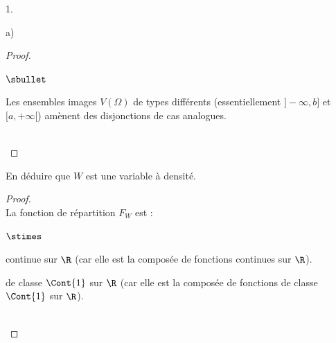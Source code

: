 \begin{noliste}{1.}
\begin{noliste}{a)}
\begin{proof}
\begin{remark}
\begin{noliste}{$\sbullet$}
        \item Les ensembles images $V(\Omega)$ de types différents
          (essentiellement $]-\infty, b]$ et $[a, +\infty[$) amènent
          des disjonctions de cas analogues.
        \end{noliste}
      \end{remark}~\\[-1.2cm]
    \end{proof}
    

    \newpage


  \item En déduire que $W$ est une variable à densité.
  
  \begin{proof}~\\
      La fonction de répartition $F_W$ est :
      \begin{noliste}{$\stimes$}
      \item continue sur $\R$ (car elle est la composée de fonctions
        continues sur $\R$).
      \item de classe $\Cont{1}$ sur $\R$ (car elle est la composée de
        fonctions de classe $\Cont{1}$ sur $\R$).
      \end{noliste}
      ~\\[-1.2cm]
    \end{proof}
  \end{noliste}
\end{noliste}

